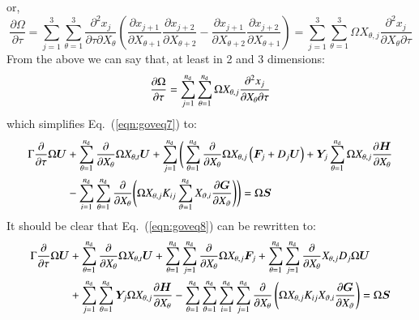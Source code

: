 \documentclass{warpdoc}
\newcommand{\alb}{\vspace{0.2cm}\\} %
\newcommand{\nd}{{{n}_{\rm d}}}
\renewcommand{\vec}[1]{\bm{#1}}
\begin{document}
%
or,
%
\begin{equation}
  \frac{\partial \Omega}{\partial \tau}=\sum_{j=1}^3 \sum_{\theta=1}^3
       \frac{\partial^2 x_j}{\partial \tau \partial X_\theta}
         \left(
           \frac{\partial x_{j+1}}{\partial X_{\theta+1}} \frac{\partial x_{j+2}}{\partial X_{\theta+2}}
          -\frac{\partial x_{j+1}}{\partial X_{\theta+2}} \frac{\partial x_{j+2}}{\partial X_{\theta+1}}
         \right)
  =\sum_{j=1}^3 \sum_{\theta=1}^3
       \Omega X_{\theta,j} \frac{\partial^2 x_j}{\partial X_\theta \partial \tau }
\end{equation}
%
From the above we can say that, at least in 2 and 3 dimensions:
%
\begin{equation}
  \frac{\partial \Omega}{\partial \tau}
  =\sum_{j=1}^\nd \sum_{\theta=1}^\nd
       \Omega X_{\theta,j} \frac{\partial^2 x_j}{\partial X_\theta \partial \tau }
  \label{eqn:invariant2}
\end{equation}
%
which simplifies Eq.\  (\ref{eqn:goveq7}) to:
%
\begin{align}
    \Gamma \frac{\partial }{\partial \tau} \Omega\vec{U}
     &+ \sum_{\theta=1}^\nd  \frac{\partial }{\partial X_\theta} \Omega X_{\theta,t} \vec{U}
    + \sum_{j=1}^\nd \Bigg( \sum_{\theta=1}^\nd \frac{\partial}{\partial X_\theta} \Omega X_{\theta,j} \left(\vec{F}_j+D_j \vec{U}\right)
    +\vec{Y}_j  \sum_{\theta=1}^\nd \Omega X_{\theta,j}\frac{\partial \vec{H}}{\partial X_\theta}
     \nonumber\alb
    &- \sum_{i=1}^\nd \sum_{\theta=1}^\nd   \frac{\partial}{\partial X_\theta}
       \Bigg( \Omega X_{\theta,j} K_{ij} \sum_{\vartheta=1}^\nd X_{\vartheta,i}\frac{\partial \vec{G}}{\partial X_\vartheta} \Bigg)\Bigg)
    = \Omega\vec{S} 
 \label{eqn:goveq8}
\end{align}
%
It should be clear that Eq.\ (\ref{eqn:goveq8}) can be rewritten to:
%
\begin{align}
    \Gamma \frac{\partial }{\partial \tau} \Omega \vec{U}
    &+ \sum_{\theta=1}^\nd  \frac{\partial }{\partial X_\theta} \Omega X_{\theta,t} \vec{U}
    +  \sum_{\theta=1}^\nd \sum_{j=1}^\nd \frac{\partial}{\partial X_\theta} \Omega X_{\theta,j} \vec{F}_j 
    +  \sum_{\theta=1}^\nd \sum_{j=1}^\nd \frac{\partial}{\partial X_\theta}  X_{\theta,j} D_j \Omega \vec{U}    \nonumber\alb
    &+\sum_{j=1}^\nd   \sum_{\theta=1}^\nd \vec{Y}_j \Omega X_{\theta,j}\frac{\partial \vec{H}}{\partial X_\theta}
    -  \sum_{\theta=1}^\nd \sum_{\vartheta=1}^\nd \sum_{i=1}^\nd \sum_{j=1}^\nd
       \frac{\partial}{\partial X_\theta}
       \left( \Omega X_{\theta,j} K_{ij}  X_{\vartheta,i}\frac{\partial \vec{G}}{\partial X_\vartheta} \right)
    = \Omega \vec{S}
 \label{eqn:goveq9}
\end{align}
\end{document}
